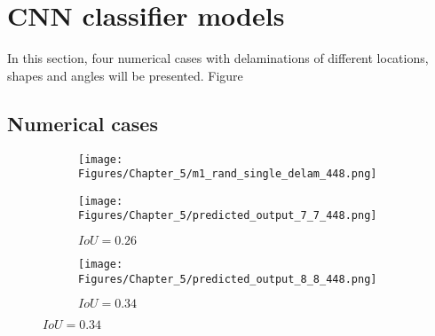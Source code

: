 \section{CNN classifier models}
\label{sec51}

In this section, four numerical cases with delaminations of different locations, shapes and angles will be presented.
Figure

\subsection{Numerical cases}
\label{sec511}

\begin{figure} [h!]
	\centering
	\begin{subfigure}[b]{0.32\textwidth}
		\centering
		\texttt{[image: Figures/Chapter\_5/m1\_rand\_single\_delam\_448.png]}
		\caption{}
		\label{fig:GT_case_448}
	\end{subfigure}	
	\hfill
	\begin{subfigure}[b]{0.32\textwidth}
		\centering
		\texttt{[image: Figures/Chapter\_5/predicted\_output\_7\_7\_448.png]}
		\caption{\(IoU=0.26\)}
		\label{fig:pred_7_7_case_448}
	\end{subfigure}
	\hfill
	\begin{subfigure}[b]{0.32\textwidth}
		\centering
		\texttt{[image: Figures/Chapter\_5/predicted\_output\_8\_8\_448.png]}
		\caption{\(IoU=0.34\)}
		\label{fig:pred_8_8_case_448}
	\end{subfigure}	


\end{figure}
